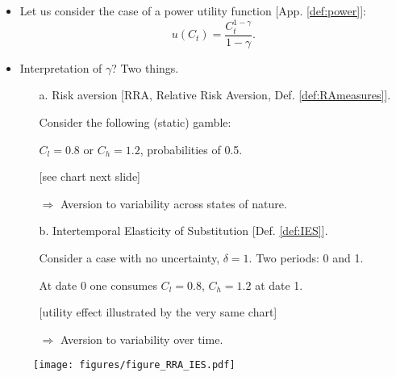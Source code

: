 \begin{frame}\label{slide:gamma}
\begin{footnotesize}
\begin{itemize}
	\item Let us consider the case of a power utility function [App. \ref{def:power}]:
	$$
	u(C_t) = \frac{C_t^{1-\gamma}}{1 - \gamma}.
	$$
	\item Interpretation of $\gamma$? Two things.
	\begin{itemize}
		\item[a.] {\color{blue}Risk aversion} [RRA, Relative Risk Aversion, Def. \ref{def:RAmeasures}].
		
\begin{scriptsize}
		Consider the following (static) gamble:
		
		$C_l= 0.8$ or $C_h= 1.2$, probabilities of 0.5.
				
		[see chart next slide]
		
		$\Rightarrow$ Aversion to variability {\color{red}across states of nature}.

		\vspace{.3cm}
\end{scriptsize}
		
		\item[b.] {\color{blue}Intertemporal Elasticity of Substitution} [Def. \ref{def:IES}].
		
\begin{scriptsize}
		Consider a case with no uncertainty, $\delta=1$. Two periods: 0 and 1.
		
		At date 0 one consumes $C_l=0.8$, $C_h=1.2$ at date 1.
		
		[utility effect illustrated by the very same chart]

		$\Rightarrow$ Aversion to variability {\color{red}over time}.
\end{scriptsize}
		
		
	\end{itemize}
\end{itemize}
\end{footnotesize}
\end{frame}

\begin{frame}
\begin{footnotesize}
		\begin{figure}
			\texttt{[image: figures/figure\_RRA\_IES.pdf]}
		\end{figure}
\end{footnotesize}
\end{frame}


